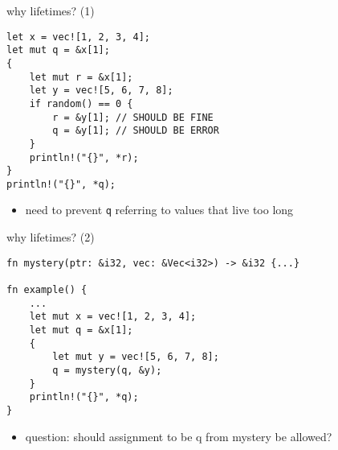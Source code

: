 \begin{frame}[fragile,label=whyLifetime1]{why lifetimes? (1)}
\begin{lstlisting}
let x = vec![1, 2, 3, 4];
let mut q = &x[1];
{
    let mut r = &x[1];
    let y = vec![5, 6, 7, 8];
    if random() == 0 {
        r = &y[1]; // SHOULD BE FINE
        q = &y[1]; // SHOULD BE ERROR
    }
    println!("{}", *r);
}
println!("{}", *q);
\end{lstlisting}
\begin{itemize}
\item need to prevent \texttt{q} referring to values that live too long
\end{itemize}
\end{frame}

\begin{frame}[fragile,label=whyLifetime2]{why lifetimes? (2)}
\begin{lstlisting}
fn mystery(ptr: &i32, vec: &Vec<i32>) -> &i32 {...}

fn example() {
    ...
    let mut x = vec![1, 2, 3, 4];
    let mut q = &x[1];
    {
        let mut y = vec![5, 6, 7, 8];
        q = mystery(q, &y);
    }
    println!("{}", *q);
}
\end{lstlisting}
\begin{itemize}
\item question: should assignment to be q from mystery be allowed?
\end{itemize}
\end{frame}
